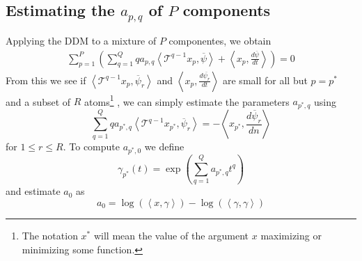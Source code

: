 \documentclass[plainsections,landscape]{sciposter}
\begin{document}
\begin{multicols}{5}
\section{Estimating the \lowercase{$a_{p,q}$} of $P$ components}

Applying the DDM to a mixture of $P$ componentes, we obtain
%
\begin{multline}
    \label{eq:mixest}
    \sum_{p=1}^{P} \left(
    \sum_{q=1}^{Q} q a_{p,q} 
    \left\langle \mathcal{T}^{q-1} x_{p} , \overline{\psi} \right\rangle
    + \left\langle x_{p}, \frac{d\overline{\psi}}{dt} \right\rangle \right)
    = 0
\end{multline}
%
From this we see if $\left\langle \mathcal{T}^{q-1} x_{p} , \overline{\psi}_{r}
\right\rangle$ and $\left\langle x_{p}, \frac{d\overline{\psi_{r}}}{dt} \right\rangle$
are small for all but $p = p^{\ast}$ and a subset of $R$ atoms\footnote{%
The notation $x^{\ast}$ will mean the value of the argument $x$ maximizing or minimizing some
function.
}%
, we can simply estimate the parameters $a_{p^{\ast},q}$ using
\begin{equation}
    \sum_{q=1}^{Q} q a_{{p^{\ast}},q} 
    \left\langle \mathcal{T}^{q-1} x_{p^{\ast}} , \overline{\psi}_{r} \right\rangle
    = -\left\langle x_{p^{\ast}}, \frac{d\overline{\psi}_{r}}{dn} \right\rangle
\end{equation}
for $1 \leq r \leq R$.
To compute $a_{p^{\ast},0}$ we define
\begin{equation}
    \gamma_{p^{\ast}}(t) = \exp \left( \sum_{q=1}^{Q} a_{p^{\ast},q} t^{q} \right)
\end{equation}
and estimate $a_0$ as
\begin{equation}
    \label{eq:ddmesta0}
    a_0 = \log \left( \left\langle x , \gamma \right\rangle \right)
        - \log \left( \left\langle \gamma , \gamma \right\rangle \right)
\end{equation}


\end{multicols}
\end{document}
